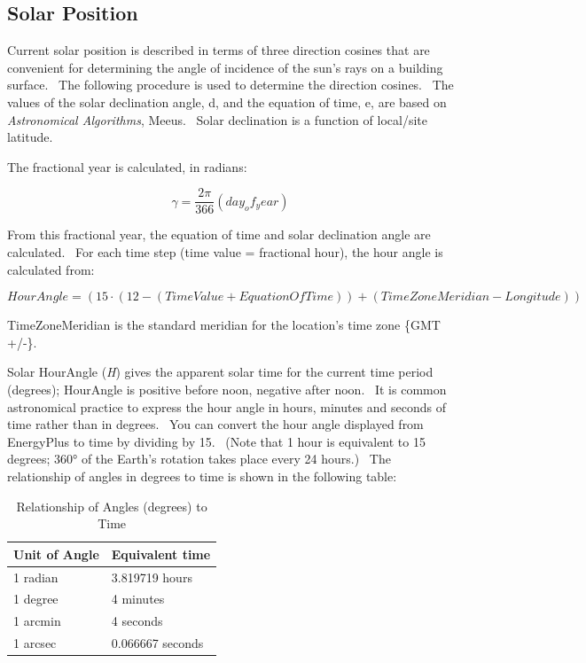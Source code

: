 \subsection{Solar Position}\label{solar-position}

Current solar position is described in terms of three direction cosines that are convenient for determining the angle of incidence of the sun's rays on a building surface.~ The following procedure is used to determine the direction cosines.~ The values of the solar declination angle, d, and the equation of time, e, are based on \emph{Astronomical Algorithms}, Meeus.~ Solar declination is a function of local/site latitude.

The fractional year is calculated, in radians:

\begin{equation}
\gamma  = \frac{{2\pi }}{{366}}(day_of_year)
\end{equation}

From this fractional year, the equation of time and solar declination angle are calculated.~ For each time step (time value = fractional hour), the hour angle is calculated from:

\begin{equation}
HourAngle = \left( {15\cdot \left( {12 - \left( {TimeValue + EquationOfTime} \right)} \right) + \left( {TimeZoneMeridian - Longitude} \right)} \right)
\end{equation}

TimeZoneMeridian is the standard meridian for the location's time zone \{GMT +/-\}.

Solar HourAngle (\emph{H}) gives the apparent solar time for the current time period (degrees); HourAngle is positive before noon, negative after noon.~ It is common astronomical practice to express the hour angle in hours, minutes and seconds of time rather than in degrees.~ You can convert the hour angle displayed from EnergyPlus to time by dividing by 15.~ (Note that 1 hour is equivalent to 15 degrees; 360° of the Earth's rotation takes place every 24 hours.)~ The relationship of angles in degrees to time is shown in the following table:

\begin{longtable}[c]{@{}ll@{}}
\caption{  Relationship of Angles (degrees) to Time \protect \label{table:relationship-of-angles-degrees-to-time}}\\
\toprule 
Unit of Angle & Equivalent time \tabularnewline \midrule
\endhead
1 radian & 3.819719 hours \tabularnewline
1 degree & 4 minutes \tabularnewline
1 arcmin & 4 seconds \tabularnewline
1 arcsec & 0.066667 seconds \tabularnewline
\bottomrule
\end{longtable}

